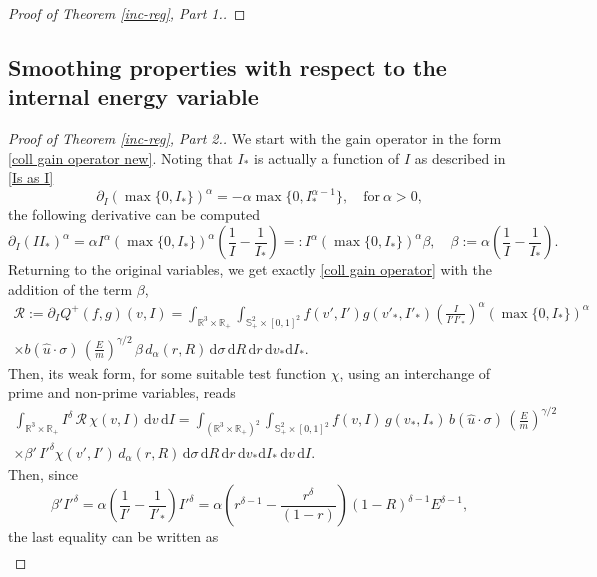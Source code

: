 \documentclass[11pt,a4paper]{amsart}
\newcommand{\bRp}{\mathbb{R}_+}
\newcommand{\bRfp}{\mathbb{R}^3 \times \bRp}
\newcommand{\bSp}{\mathbb{S}^2_+}
\newcommand{\md}{\mathrm{d}}
\newcommand{\dpo}{d_\alpha(r,R)}
\newcommand{\g}{\gamma}
\newcommand{\E}{\left(\frac{E}{m}\right)}
\newcommand{\kk}{\beta}
\newcommand{\test}{I^\delta}
\newcommand{\testp}{I'^\delta}
\newcommand{\domparam}{\bSp \times [0,1]^2}
\newcommand{\iallintro}{\int_{(\bRfp)^2}\int_{\domparam}}
\newcommand{\istarintro}{\int_{\bRfp}\int_{\domparam }}
\newcommand{\dall}{ \md \sigma \, \md R \, \md r \, \md v_* \md I_* \, \md v \, \md I}
\newcommand{\dstar}{ \md \sigma \, \md R \, \md r \, \md v_* \md I_*}
\newcommand{\RI}{\mathcal{R}}
\begin{document}
\begin{proof}[Proof of Theorem \ref{inc-reg}, Part 1.]
\end{proof}


\subsection{Smoothing properties with respect to the internal energy variable}\label{Sec: proof smooth I}



\begin{proof}[Proof of Theorem \ref{inc-reg}, Part 2.] We start with the gain operator in the form \eqref{coll gain operator new}. Noting that $I_*$ is actually a function of $I$ as described in \eqref{Is as I}
	\begin{equation*}
\partial_I  (\max\{0,I_*\})^\alpha  = - \alpha \max\{0,I_*^{\alpha-1}\}, \quad \text{for} \ \alpha>0,
	\end{equation*}
the following derivative can be computed
\begin{equation*}
	\partial_I \left(I I_*\right)^\alpha = \alpha I^\alpha   (\max\{0,I_*\})^\alpha  \left(\frac{1}{I} - \frac{1}{I_*}\right) =:  I^\alpha   (\max\{0,I_*\})^\alpha  \kk, \quad \kk:=\alpha \left(\frac{1}{I} - \frac{1}{I_*}\right).
\end{equation*}
Returning to the original variables, we get exactly \eqref{coll gain operator} with the addition of the term $\kk$,
		\begin{multline*}
\RI :=\partial_{I}		Q^+(f,g)(v,I) =\istarintro  f(v',I')g(v'_*,I'_*) \left(\frac{I }{I' I'_* }\right)^{\alpha}  (\max\{0,I_*\})^\alpha \\ \times b(\hat{u}\cdot\sigma) \, \E^{\g/2} \, \kk \, \dpo \, \dstar.
	\end{multline*}
Then, its weak form, for some suitable test function $\chi$, using an  interchange of prime and non-prime variables, reads
\begin{multline*}
	\int_{ \bRfp } \test \, \RI \, \chi(v,I) \, \md v \, \md I 
	=\iallintro  f(v,I) \, g(v_*,I_*)   \,   b(\hat{u}\cdot\sigma) \, \E^{\g/2} \, \\ \times \kk'\, \testp \chi(v',I')  \, \dpo  \, 	\dall.
\end{multline*}
Then, since
\begin{equation*}
  \kk' \testp =  \alpha   \left(\frac{1}{I'} - \frac{1}{I'_*}\right) \testp = \alpha \left( r^{\delta - 1 } - \frac{r^\delta}{(1-r)} \right) \left(1-R\right)^{\delta-1} E^{\delta -1},
\end{equation*}
the last equality can be written as
\begin{multline*}

\end{multline*}
\end{proof}
\end{document}
